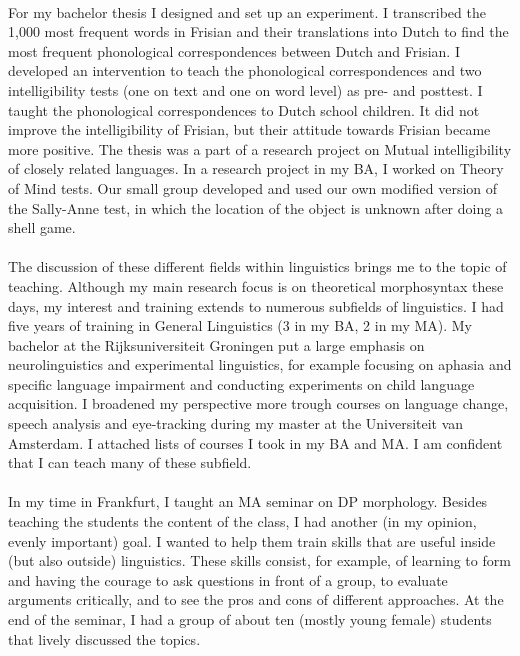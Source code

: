\documentclass[12pt]{article}
\begin{document}
\phantom{x}\\

For my bachelor thesis I designed and set up an experiment. I transcribed the 1,000 most frequent words in Frisian and their translations into Dutch to find the most frequent phonological correspondences between Dutch and Frisian. I developed an intervention to teach the phonological correspondences and two intelligibility tests (one on text and one on word level) as pre- and posttest. I taught the phonological correspondences to Dutch school children. It did not improve the intelligibility of Frisian, but their attitude towards Frisian became more positive. The thesis was a part of a research project on Mutual intelligibility of closely related languages. In a research project in my BA, I worked on Theory of Mind tests. Our small group developed and used our own modified version of the Sally-Anne test, in which the location of the object is unknown after doing a shell game.\\

\phantom{x}\\

The discussion of these different fields within linguistics brings me to the topic of teaching. Although my main research focus is on theoretical morphosyntax these days, my interest and training extends to numerous subfields of linguistics. I had five years of training in General Linguistics (3 in my BA, 2 in my MA). My bachelor at the Rijksuniversiteit Groningen put a large emphasis on neurolinguistics and experimental linguistics, for example focusing on aphasia and specific language impairment and conducting experiments on child language acquisition. I broadened my perspective more trough courses on language change, speech analysis and eye-tracking during my master at the Universiteit van Amsterdam. I attached lists of courses I took in my BA and MA. I am confident that I can teach many of these subfield.\\

\phantom{x}\\

In my time in Frankfurt, I taught an MA seminar on DP morphology. Besides teaching the students the content of the class, I had another (in my opinion, evenly important) goal. I wanted to help them train skills that are useful inside (but also outside) linguistics. These skills consist, for example, of learning to form and having the courage to ask questions in front of a group, to evaluate arguments critically, and to see the pros and cons of different approaches. At the end of the seminar, I had a group of about ten (mostly young female) students that lively discussed the topics.
\\
\end{document}
